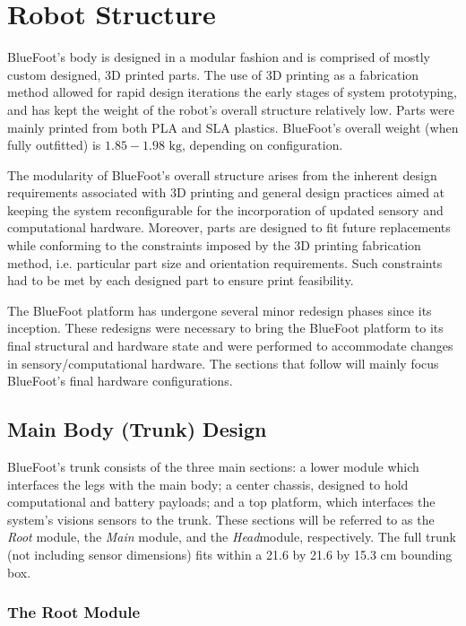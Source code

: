 	\section{Robot Structure}
	
		BlueFoot's body is designed in a modular fashion and is comprised of mostly custom designed, 3D printed parts. The use of 3D printing as a fabrication method allowed for rapid design iterations the early stages of system prototyping, and has kept the weight of the robot's overall structure relatively low. Parts were mainly printed from both PLA and SLA plastics. BlueFoot's overall weight (when fully outfitted) is $1.85-1.98 \text{ kg}$, depending on configuration.

		The modularity of BlueFoot's overall structure arises from the inherent design requirements associated with 3D printing and general design practices aimed at keeping the system reconfigurable for the incorporation of updated sensory and computational hardware. Moreover, parts are designed to fit future replacements while conforming to the constraints imposed by the 3D printing fabrication method, i.e. particular part size and orientation requirements. Such constraints had to be met by each designed part to ensure print feasibility. 

		The BlueFoot platform has undergone several minor redesign phases since its inception. These redesigns were necessary to bring the BlueFoot platform to its final structural and hardware state and were performed to accommodate changes in  sensory/computational hardware. The sections that follow will mainly focus BlueFoot's final hardware configurations.

		\subsection{Main Body (Trunk) Design}
		
			BlueFoot's trunk consists of the three main sections: a lower module which interfaces the legs with the main body; a center chassis, designed to  hold computational and battery payloads; and a top platform, which interfaces the system's visions sensors to the trunk. These sections will be referred to as the \emph{Root} module, the \emph{Main} module, and the \emph{Head}module, respectively. The full trunk (not including sensor dimensions) fits within a 21.6 by 21.6 by 15.3 cm bounding box. 

			\subsubsection{The Root Module}

